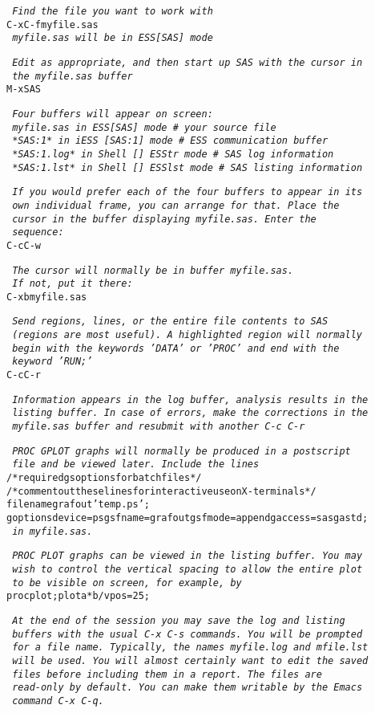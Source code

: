 \documentclass{article}
\newcommand*{\Scmt}[1]{\hbox{\qquad {\footnotesize \#\#} \textsl{#1}}}
\newenvironment{Salltt}{\small\begin{alltt}}{\end{alltt}}
\begin{document}
\begin{Salltt}
    \Scmt{Find the file you want to work with}
    C-x C-f myfile.sas
    \Scmt{myfile.sas will be in ESS[SAS] mode}

    \Scmt{Edit as appropriate, and then start up SAS with the cursor in}
    \Scmt{the myfile.sas buffer}
    M-x SAS

    \Scmt{Four buffers will appear on screen:}
    \Scmt{myfile.sas  in  ESS[SAS]        mode # your source file}
    \Scmt{*SAS:1*     in  iESS [SAS:1]    mode # ESS communication buffer}
    \Scmt{*SAS:1.log* in  Shell [] ESStr  mode # SAS log information}
    \Scmt{*SAS:1.lst* in  Shell [] ESSlst mode # SAS listing information}

    \Scmt{If you would prefer each of the four buffers to appear in its}
    \Scmt{own individual frame, you can arrange for that.  Place the}
    \Scmt{cursor in the buffer displaying myfile.sas.  Enter the}
    \Scmt{sequence:}
    C-c C-w

    \Scmt{The cursor will normally be in buffer myfile.sas.}
    \Scmt{If not, put it there:}
    C-x b myfile.sas

    \Scmt{Send regions, lines, or the entire file contents to SAS}
    \Scmt{(regions are most useful).  A highlighted region will normally}
    \Scmt{begin with the keywords 'DATA' or 'PROC' and end with the}
    \Scmt{keyword 'RUN;'}
    C-c C-r

    \Scmt{Information appears in the log buffer, analysis results in the}
    \Scmt{listing buffer.  In case of errors, make the corrections in the}
    \Scmt{myfile.sas buffer and resubmit with another C-c C-r}

    \Scmt{PROC GPLOT graphs will normally be produced in a postscript}
    \Scmt{file and be viewed later.  Include the lines}
    /* required gsoptions for batch files */
    /* comment out these lines for interactive use on X-terminals*/
    filename grafout 'temp.ps';
    goptions device=ps gsfname=grafout gsfmode=append gaccess=sasgastd;
    \Scmt{in myfile.sas.}

    \Scmt{PROC PLOT graphs can be viewed in the listing buffer.  You may}
    \Scmt{wish to control the vertical spacing to allow the entire plot}
    \Scmt{to be visible on screen, for example, by}
    proc plot; plot a*b / vpos=25;

    \Scmt{At the end of the session you may save the log and listing}
    \Scmt{buffers with the usual C-x C-s commands.  You will be prompted}
    \Scmt{for a file name.  Typically, the names myfile.log and mfile.lst}
    \Scmt{will be used.  You will almost certainly want to edit the saved}
    \Scmt{files before including them in a report.  The files are}
    \Scmt{read-only by default.  You can make them writable by the Emacs}
    \Scmt{command C-x C-q.}


\end{Salltt}
\end{document}
